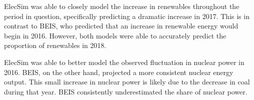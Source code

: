 ElecSim was able to closely model the increase in renewables throughout the period in question, specifically predicting a dramatic increase in 2017. This is in contrast to BEIS, who predicted that an increase in renewable energy would begin in 2016. However, both models were able to accurately predict the proportion of renewables in 2018. 

ElecSim was able to better model the observed fluctuation in nuclear power in 2016. BEIS, on the other hand, projected a more consistent nuclear energy output. This small increase in nuclear power is likely due to the decrease in coal during that year. BEIS consistently underestimated the share of nuclear power. 









%


%




%



